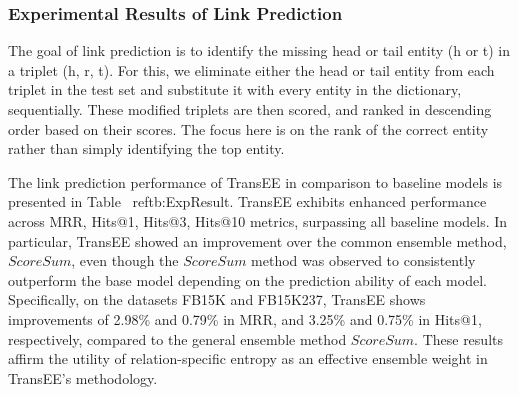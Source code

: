 \documentclass{article}
\begin{document}
\subsubsection{Experimental Results of Link Prediction}
The goal of link prediction is to identify the missing head or tail entity (h or t) in a triplet (h, r, t). For this, we eliminate either the head or tail entity from each triplet in the test set and substitute it with every entity in the dictionary, sequentially. These modified triplets are then scored, and ranked in descending order based on their scores. The focus here is on the rank of the correct entity rather than simply identifying the top entity.

The link prediction performance of TransEE in comparison to baseline models is presented in Table ~ref{tb:ExpResult}. TransEE exhibits enhanced performance across MRR, Hits@1, Hits@3, Hits@10 metrics, surpassing all baseline models. In particular, TransEE showed an improvement over the common ensemble method, $ScoreSum$, even though the $ScoreSum$ method was observed to consistently outperform the base model depending on the prediction ability of each model. Specifically, on the datasets FB15K and FB15K237, TransEE shows improvements of 2.98\% and 0.79\% in MRR, and 3.25\% and 0.75\% in Hits@1, respectively, compared to the general ensemble method $ScoreSum$. These results affirm the utility of relation-specific entropy as an effective ensemble weight in TransEE's methodology.
\end{document}
